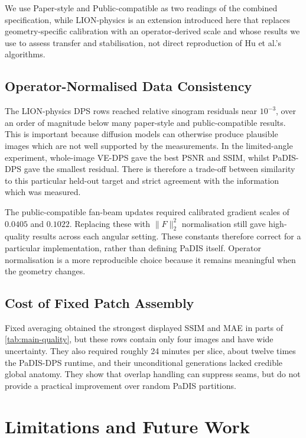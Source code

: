 We use Paper-style and Public-compatible as two readings of the combined specification, while LION-physics is an extension introduced here that replaces geometry-specific calibration with an operator-derived scale and whose results we use to assess transfer and stabilisation, not direct reproduction of Hu et al.'s algorithms.

\subsection{Operator-Normalised Data Consistency}

The LION-physics DPS rows reached relative sinogram residuals near \(10^{-3}\), over an order of magnitude below many paper-style and public-compatible results. This is important because diffusion models can otherwise produce plausible images which are not well supported by the measurements. In the limited-angle experiment, whole-image VE-DPS gave the best PSNR and SSIM, whilst PaDIS-DPS gave the smallest residual. There is therefore a trade-off between similarity to this particular held-out target and strict agreement with the information which was measured.

The public-compatible fan-beam updates required calibrated gradient scales of \(0.0405\) and \(0.1022\). Replacing these with \(\lVert F\rVert_2^2\) normalisation still gave high-quality results across each angular setting. These constants therefore correct for a particular implementation, rather than defining PaDIS itself. Operator normalisation is a more reproducible choice because it remains meaningful when the geometry changes.

\subsection{Cost of Fixed Patch Assembly}

Fixed averaging obtained the strongest displayed SSIM and MAE in parts of \autoref{tab:main-quality}, but these rows contain only four images and have wide uncertainty. They also required roughly 24 minutes per slice, about twelve times the PaDIS-DPS runtime, and their unconditional generations lacked credible global anatomy. They show that overlap handling can suppress seams, but do not provide a practical improvement over random PaDIS partitions.

\section{Limitations and Future Work}

